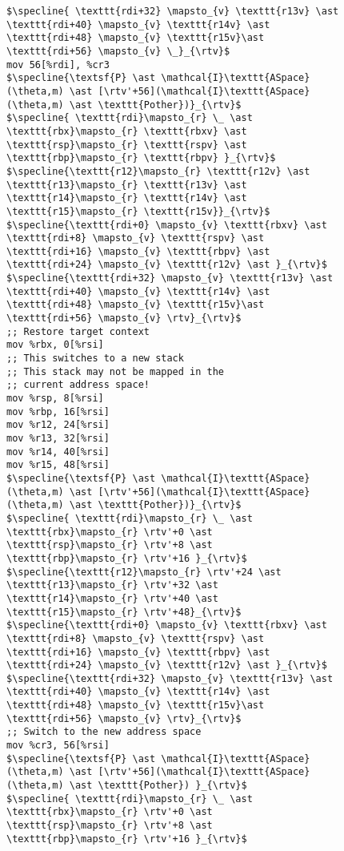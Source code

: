 \begin{figure}
\begin{lstlisting}
$\specline{ \texttt{rdi+32} \mapsto_{v} \texttt{r13v} \ast \texttt{rdi+40} \mapsto_{v} \texttt{r14v} \ast \texttt{rdi+48} \mapsto_{v} \texttt{r15v}\ast \texttt{rdi+56} \mapsto_{v} \_}_{\rtv}$
mov 56[%rdi], %cr3
$\specline{\textsf{P} \ast \mathcal{I}\texttt{ASpace}(\theta,m) \ast [\rtv'+56](\mathcal{I}\texttt{ASpace}(\theta,m) \ast \texttt{Pother})}_{\rtv}$
$\specline{ \texttt{rdi}\mapsto_{r} \_ \ast \texttt{rbx}\mapsto_{r} \texttt{rbxv} \ast  \texttt{rsp}\mapsto_{r} \texttt{rspv} \ast \texttt{rbp}\mapsto_{r} \texttt{rbpv} }_{\rtv}$
$\specline{\texttt{r12}\mapsto_{r} \texttt{r12v} \ast \texttt{r13}\mapsto_{r} \texttt{r13v} \ast \texttt{r14}\mapsto_{r} \texttt{r14v} \ast \texttt{r15}\mapsto_{r} \texttt{r15v}}_{\rtv}$
$\specline{\texttt{rdi+0} \mapsto_{v} \texttt{rbxv} \ast \texttt{rdi+8} \mapsto_{v} \texttt{rspv} \ast \texttt{rdi+16} \mapsto_{v} \texttt{rbpv} \ast \texttt{rdi+24} \mapsto_{v} \texttt{r12v} \ast }_{\rtv}$
$\specline{\texttt{rdi+32} \mapsto_{v} \texttt{r13v} \ast \texttt{rdi+40} \mapsto_{v} \texttt{r14v} \ast \texttt{rdi+48} \mapsto_{v} \texttt{r15v}\ast \texttt{rdi+56} \mapsto_{v} \rtv}_{\rtv}$    
;; Restore target context
mov %rbx, 0[%rsi] 
;; This switches to a new stack
;; This stack may not be mapped in the
;; current address space!
mov %rsp, 8[%rsi] 
mov %rbp, 16[%rsi]
mov %r12, 24[%rsi]
mov %r13, 32[%rsi]
mov %r14, 40[%rsi]
mov %r15, 48[%rsi]
$\specline{\textsf{P} \ast \mathcal{I}\texttt{ASpace}(\theta,m) \ast [\rtv'+56](\mathcal{I}\texttt{ASpace}(\theta,m) \ast \texttt{Pother})}_{\rtv}$
$\specline{ \texttt{rdi}\mapsto_{r} \_ \ast \texttt{rbx}\mapsto_{r} \rtv'+0 \ast  \texttt{rsp}\mapsto_{r} \rtv'+8 \ast \texttt{rbp}\mapsto_{r} \rtv'+16 }_{\rtv}$
$\specline{\texttt{r12}\mapsto_{r} \rtv'+24 \ast \texttt{r13}\mapsto_{r} \rtv'+32 \ast \texttt{r14}\mapsto_{r} \rtv'+40 \ast \texttt{r15}\mapsto_{r} \rtv'+48}_{\rtv}$
$\specline{\texttt{rdi+0} \mapsto_{v} \texttt{rbxv} \ast \texttt{rdi+8} \mapsto_{v} \texttt{rspv} \ast \texttt{rdi+16} \mapsto_{v} \texttt{rbpv} \ast \texttt{rdi+24} \mapsto_{v} \texttt{r12v} \ast }_{\rtv}$
$\specline{\texttt{rdi+32} \mapsto_{v} \texttt{r13v} \ast \texttt{rdi+40} \mapsto_{v} \texttt{r14v} \ast \texttt{rdi+48} \mapsto_{v} \texttt{r15v}\ast \texttt{rdi+56} \mapsto_{v} \rtv}_{\rtv}$
;; Switch to the new address space
mov %cr3, 56[%rsi]
$\specline{\textsf{P} \ast \mathcal{I}\texttt{ASpace}(\theta,m) \ast [\rtv'+56](\mathcal{I}\texttt{ASpace}(\theta,m) \ast \texttt{Pother}) }_{\rtv}$
$\specline{ \texttt{rdi}\mapsto_{r} \_ \ast \texttt{rbx}\mapsto_{r} \rtv'+0 \ast  \texttt{rsp}\mapsto_{r} \rtv'+8 \ast \texttt{rbp}\mapsto_{r} \rtv'+16 }_{\rtv}$

\end{lstlisting}
\end{figure}

